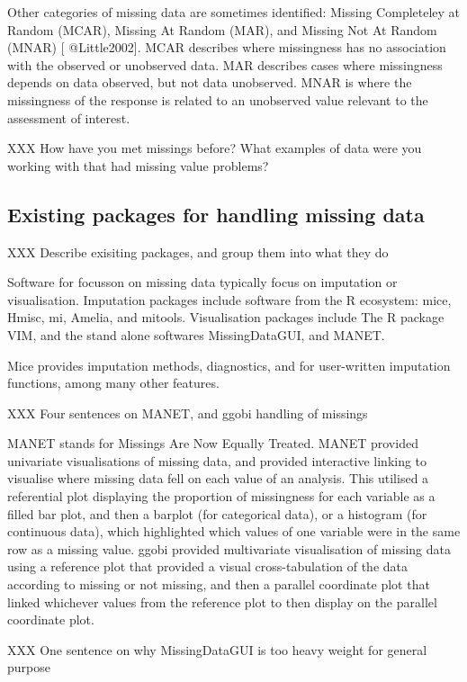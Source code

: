 \documentclass[]{article}
\begin{document}
Other categories of missing data are sometimes identified: Missing
Completeley at Random (MCAR), Missing At Random (MAR), and Missing Not
At Random (MNAR) {[} @Little2002{]}. MCAR describes where missingness
has no association with the observed or unobserved data. MAR describes
cases where missingness depends on data observed, but not data
unobserved. MNAR is where the missingness of the response is related to
an unobserved value relevant to the assessment of interest.

XXX How have you met missings before? What examples of data were you
working with that had missing value problems?

\subsection{Existing packages for handling missing
data}\label{existing-packages-for-handling-missing-data}

XXX Describe exisiting packages, and group them into what they do

Software for focusson on missing data typically focus on imputation or
visualisation. Imputation packages include software from the R
ecosystem: mice, Hmisc, mi, Amelia, and mitools. Visualisation packages
include The R package VIM, and the stand alone softwares MissingDataGUI,
and MANET.

Mice provides imputation methods, diagnostics, and for user-written
imputation functions, among many other features.

XXX Four sentences on MANET, and ggobi handling of missings

MANET stands for Missings Are Now Equally Treated. MANET provided
univariate visualisations of missing data, and provided interactive
linking to visualise where missing data fell on each value of an
analysis. This utilised a referential plot displaying the proportion of
missingness for each variable as a filled bar plot, and then a barplot
(for categorical data), or a histogram (for continuous data), which
highlighted which values of one variable were in the same row as a
missing value. ggobi provided multivariate visualisation of missing data
using a reference plot that provided a visual cross-tabulation of the
data according to missing or not missing, and then a parallel coordinate
plot that linked whichever values from the reference plot to then
display on the parallel coordinate plot.

XXX One sentence on why MissingDataGUI is too heavy weight for general
purpose
\end{document}
